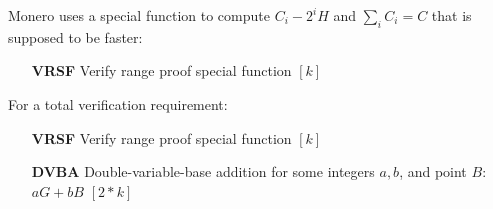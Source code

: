 Monero uses a special function to compute $C_i - 2^i H$ and $\sum_i C_i = C$ that is supposed to be faster:

\begin{itemize}
    \setlength\itemsep{\listspace}
    \item [\textbf{VRSF}] Verify range proof special function \quad \([k]\)
\end{itemize}

For a total verification requirement:

\begin{itemize}
    \setlength\itemsep{\listspace}
    \item [\textbf{VRSF}] Verify range proof special function \quad \([k]\)
    \item [\textbf{DVBA}] Double-variable-base addition for some integers $a, b$, and point $B$: $a G + b B$ \quad \([2*k]\)
\end{itemize}